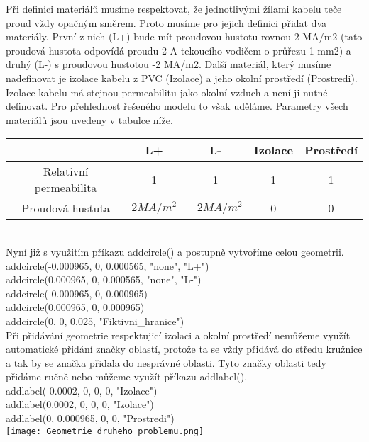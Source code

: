 \documentclass[a4paper, oneside]{article}
\begin{document}
\indent Při definici materiálů musíme respektovat, že jednotlivými žílami kabelu teče proud vždy opačným směrem. Proto musíme pro jejich definici přidat dva materiály. První z nich (L+) bude mít proudovou hustotu rovnou 2 MA/m2 (tato proudová hustota odpovídá proudu 2 A tekoucího vodičem o průřezu 1 mm2) a druhý (L-) s proudovou hustotou -2 MA/m2. Další materiál, který musíme nadefinovat je izolace kabelu z PVC (Izolace) a jeho okolní prostředí (Prostredi). Izolace kabelu má stejnou permeabilitu jako okolní vzduch a není ji nutné definovat. Pro přehlednost řešeného modelu to však uděláme. Parametry všech materiálů jsou uvedeny v tabulce níže.\\
\begin{tabular}{|c|c|c|c|c|}
\hline
 & L+ & L- & Izolace & Prostředí \\
\hline
Relativní permeabilita & 1 & 1 & 1 & 1\\
\hline
Proudová hustuta & $2 MA/m^2$ & $-2 MA/m^2$ & 0 & 0\\
\hline 
\end{tabular} \\
Nyní již s využitím příkazu addcircle() a postupně vytvoříme celou geometrii.\\
addcircle(-0.000965, 0, 0.000565, "none", "L+")\\
addcircle(0.000965, 0, 0.000565, "none", "L-")\\
addcircle(-0.000965, 0, 0.000965)\\
addcircle(0.000965, 0, 0.000965)\\
addcircle(0, 0, 0.025, "Fiktivni\_hranice")\\
Při přidávání geometrie respektujicí izolaci a okolní prostředí nemůžeme využít automatické přidání značky oblastí, protože ta se vždy přidává do středu kružnice a tak by se značka přidala do nesprávné oblasti. Tyto značky oblasti tedy přidáme ručně nebo můžeme využít příkazu addlabel().\\
addlabel(-0.0002, 0, 0, 0, "Izolace")\\
addlabel(0.0002, 0, 0, 0, "Izolace")\\
addlabel(0, 0.000965, 0, 0, "Prostredi")\\
\texttt{[image: Geometrie\_druheho\_problemu.png]}\\\
\end{document}
